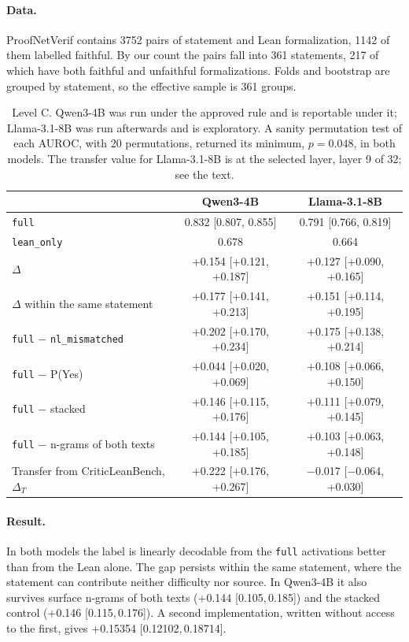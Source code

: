 \documentclass[10pt]{article}
\newcommand{\vr}[1]{\texttt{#1}}
\newcommand{\D}{\Delta}
\newcommand{\ic}[2]{[#1,\,#2]}
\begin{document}
\paragraph{Data.}
ProofNetVerif \citep{proofnetverif} contains 3752 pairs of statement and Lean formalization, 1142 of them labelled
faithful. By our count the pairs fall into 361 statements, 217 of which have both faithful and unfaithful formalizations.
Folds and bootstrap are grouped by statement, so the effective sample is 361 groups.

\begin{table}[h]
\centering
\caption{Level C. Qwen3-4B was run under the approved rule and is reportable under it; Llama-3.1-8B was run
afterwards and is exploratory. A sanity permutation test of each AUROC, with 20 permutations, returned its minimum, $p = 0.048$, in
both models. The transfer value for Llama-3.1-8B is at the selected layer, layer 9 of 32; see the text.}
\label{tab:c}
\vspace{2pt}
\begin{tabular}{@{}lcc@{}}
\toprule
 & Qwen3-4B & Llama-3.1-8B\\
\midrule
\vr{full}                               & 0.832 [0.807, 0.855] & 0.791 [0.766, 0.819]\\
\vr{lean\_only}                         & 0.678 & 0.664\\
$\D$                                    & +0.154 [+0.121, +0.187] & +0.127 [+0.090, +0.165]\\
$\D$ within the same statement          & +0.177 [+0.141, +0.213] & +0.151 [+0.114, +0.195]\\
\vr{full} $-$ \vr{nl\_mismatched}       & +0.202 [+0.170, +0.234] & +0.175 [+0.138, +0.214]\\
\vr{full} $-$ P(Yes)                    & +0.044 [+0.020, +0.069] & +0.108 [+0.066, +0.150]\\
\vr{full} $-$ stacked                 & +0.146 [+0.115, +0.176] & +0.111 [+0.079, +0.145]\\
\vr{full} $-$ n-grams of both texts       & +0.144 [+0.105, +0.185] & +0.103 [+0.063, +0.148]\\
\midrule
Transfer from CriticLeanBench, $\D_T$   & +0.222 [+0.176, +0.267] & −0.017 [−0.064, +0.030]\\
\bottomrule
\end{tabular}
\end{table}

\paragraph{Result.}
In both models the label is linearly decodable from the \vr{full} activations better than from the Lean alone. The
gap persists within the same statement, where the statement can contribute neither difficulty nor source. In
Qwen3-4B it also survives surface n-grams of both texts (+0.144 \ic{0.105}{0.185}) and the stacked control
(+0.146 \ic{0.115}{0.176}). A second implementation, written without access to the first, gives +0.15354
\ic{0.12102}{0.18714}.
\end{document}
